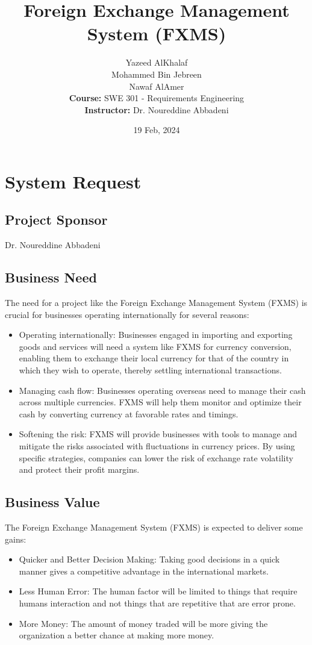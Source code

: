 \documentclass[a4paper]{report}
\title{Foreign Exchange Management System (FXMS)}
\author{
    Yazeed AlKhalaf \\
    Mohammed Bin Jebreen \\
    Nawaf AlAmer \\
    \textbf{Course:} SWE 301 - Requirements Engineering \\
    \textbf{Instructor:} Dr. Noureddine Abbadeni
}
\date{19 Feb, 2024}
\begin{document}
\maketitle

\newpage

\tableofcontents

\chapter{System Request}

\section{Project Sponsor}
Dr. Noureddine Abbadeni

\section{Business Need}
The need for a project like the Foreign Exchange Management System (FXMS) is crucial for businesses operating internationally for several reasons:
\begin{itemize}
    \item Operating internationally: Businesses engaged in importing and exporting goods and services will need a system like FXMS for currency conversion, enabling them to exchange their local currency for that of the country in which they wish to operate, thereby settling international transactions.
    \item Managing cash flow: Businesses operating overseas need to manage their cash across multiple currencies. FXMS will help them monitor and optimize their cash by converting currency at favorable rates and timings.
    \item Softening the risk: FXMS will provide businesses with tools to manage and mitigate the risks associated with fluctuations in currency prices. By using specific strategies, companies can lower the risk of exchange rate volatility and protect their profit margins.
\end{itemize}

\section{Business Value}
The Foreign Exchange Management System (FXMS) is expected to deliver some gains:
\begin{itemize}
    \item Quicker and Better Decision Making: Taking good decisions in a quick manner gives a competitive advantage in the international markets.
    \item Less Human Error: The human factor will be limited to things that require humans interaction and not things that are repetitive that are error prone.
    \item More Money: The amount of money traded will be more giving the organization a better chance at making more money.
\end{itemize}
\end{document}
